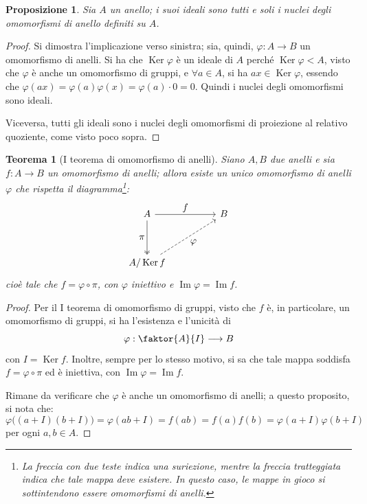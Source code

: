 \documentclass[12pt]{scrartcl}
\theoremstyle{style}
\newtheorem{prop}{Proposizione}[section]
\newtheorem{teorema}{Teorema}[section]
\numberwithin{equation}{subsection}
\begin{document}
\begin{prop}
	Sia $A$ un anello; i suoi ideali sono tutti e soli i nuclei degli omomorfismi di anello definiti su $A$.
\end{prop}
	\begin{proof}
		Si dimostra l'implicazione verso sinistra; sia, quindi, $\varphi  : A \to B$ un omomorfismo di anelli.
		Si ha che $\operatorname{Ker} \varphi $ \`e un ideale di $A$ perch\'e $\operatorname{Ker} \varphi <  A$, visto che $\varphi $ \`e anche un omomorfismo di gruppi, e $\forall a \in A$, si ha $ax \in \operatorname{Ker} \varphi $, essendo che $\varphi (ax) = \varphi (a) \varphi (x) = \varphi (a) \cdot 0 = 0$.
		Quindi i nuclei degli omomorfismi sono ideali.

		Viceversa, tutti gli ideali sono i nuclei degli omomorfismi di proiezione al relativo quoziente, come visto poco sopra.
	\end{proof}
\begin{teorema}
	[I teorema di omomorfismo di anelli]
	Siano $A,B$ due anelli e sia $f: A \to B$ un omomorfismo di anelli; allora esiste un unico omomorfismo di anelli $\varphi $ che rispetta il diagramma\footnote{La freccia con due teste indica una suriezione, mentre la freccia tratteggiata indica che tale mappa deve esistere. In questo caso, le mappe in gioco si sottintendono essere omomorfismi di anelli.}:
\[
\begin{tikzcd}
	A & & B\\
	\\
	A / \operatorname{Ker} f
	\arrow[from=1-1,to=1-3,"\displaystyle f"]
	\arrow[from=1-1,to=3-1,"\displaystyle \pi"',two heads]
	\arrow[from=3-1,to=1-3,"\displaystyle \varphi "',dashed]
\end{tikzcd}
\] 
	cio\`e tale che $f = \varphi \circ \pi$, con $\varphi $ iniettivo e $\operatorname{Im} \varphi  = \operatorname{Im} f$.
\end{teorema}
	\begin{proof}
		Per il I teorema di omomorfismo di gruppi, visto che $f$ \`e, in particolare, un omomorfismo di gruppi, si ha l'esistenza e l'unicit\`a di 
		\[
		\varphi  : \faktor{A}{I} \longrightarrow B
		\] 
		con $I = \operatorname{Ker} f$.
		Inoltre, sempre per lo stesso motivo, si sa che tale mappa soddisfa $f = \varphi  \circ \pi$ ed \`e iniettiva, con $\operatorname{Im} \varphi = \operatorname{Im} f$.
		
		Rimane da verificare che $\varphi $ \`e anche un omomorfismo di anelli; a questo proposito, si nota che:
		\[
			\varphi \big((a+I)(b+I)\big)=\varphi (ab + I) = f(ab) =f(a)f(b) = \varphi (a+I) \varphi (b+I)
		\] 
		per ogni $a,b \in A$.
	\end{proof}
\end{document}
